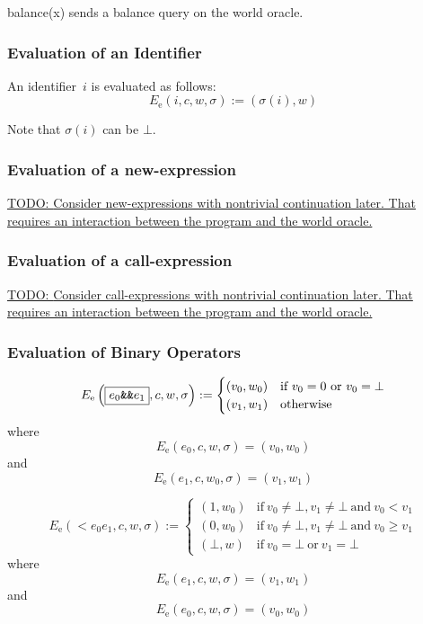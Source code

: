 \documentclass{book}
\newcommand{\todo}[1]{\underline{TODO: {#1}}}
\newcommand{\evalE}[1]{E_\mathrm{e}\left({#1}\right)}
\begin{document}
balance(x) sends a balance query on the world oracle.

\subsubsection{Evaluation of an Identifier}

An identifier~$i$ is evaluated as follows:
\[
\evalE{\boxed{i}, c, w, \sigma} := (\sigma(i), w)
\]

Note that $\sigma(i)$ can be $\bot$.

\subsubsection{Evaluation of a new-expression}

\todo{Consider new-expressions with nontrivial continuation later.  That requires an interaction between the program and the world oracle. }

\subsubsection{Evaluation of a call-expression}

\todo{Consider call-expressions with nontrivial continuation later.  That requires an interaction between the program and the world oracle. }

\subsubsection{Evaluation of Binary Operators}

\[
\evalE{\boxed{\logicalAnd{e_0}{e_1}}, c, w, \sigma} :=
\begin{cases}
  (v_0, w_0) & \text{if}\ v_0 = 0\ \text{or}\ v_0 = \bot \\
  (v_1, w_1) & \text{otherwise}
\end{cases}
\]
where
\[
\evalE{\boxed{e_0}, c, w, \sigma} = (v_0, w_0)
\]
and
\[
\evalE{\boxed{e_1}, c, w_0, \sigma} = (v_1, w_1)
\]

\[
\evalE{\boxed{\lt{e_0}{e_1}}, c, w, \sigma} :=
\begin{cases}
  (1, w_0) &\text{if}\ v_0 \neq \bot, v_1 \neq\bot\ \text{and}\ v_0 < v_1 \\
  (0, w_0) &\text{if}\ v_0 \neq \bot, v_1 \neq\bot\ \text{and}\ v_0 \ge v_1 \\
  (\bot, w) &\text{if}\ v_0 = \bot \ \text{or}\ v_1 = \bot
\end{cases}
\]
where
\[
\evalE{\boxed{e_1}, c, w, \sigma} = (v_1, w_1)
\]
and
\[
\evalE{\boxed{e_0}, c, w, \sigma} = (v_0, w_0)
\]
\end{document}
